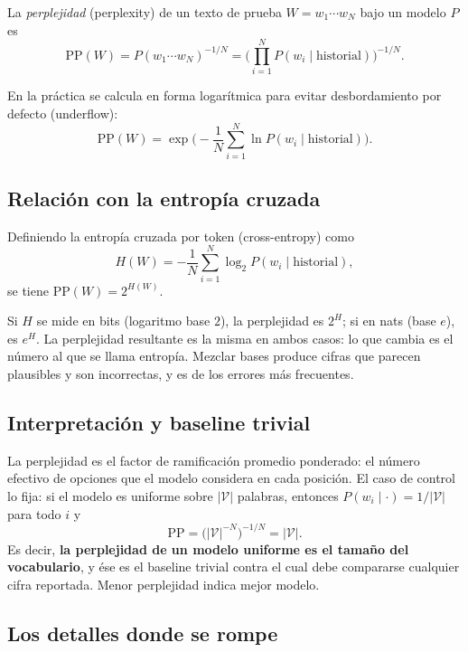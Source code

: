 \documentclass[11pt,letterpaper]{article}
\newcommand{\Vocab}{\mathcal{V}}
\begin{document}
\begin{definicion}
La \emph{perplejidad} (perplexity) de un texto de prueba $W=w_1\cdots w_N$ bajo
un modelo $P$ es
\[
\mathrm{PP}(W) = P(w_1\cdots w_N)^{-1/N}
= \Bigg(\prod_{i=1}^{N} P(w_i\mid \text{historial})\Bigg)^{-1/N} .
\]
\end{definicion}

En la práctica se calcula en forma logarítmica para evitar desbordamiento por
defecto (underflow):
\[
\mathrm{PP}(W) = \exp\Bigg(-\frac{1}{N}\sum_{i=1}^{N}\ln
P(w_i\mid\text{historial})\Bigg).
\]

\subsection{Relación con la entropía cruzada}

Definiendo la entropía cruzada por token (cross-entropy) como
\[
H(W) = -\frac{1}{N}\sum_{i=1}^{N} \log_2 P(w_i\mid\text{historial}),
\]
se tiene $\mathrm{PP}(W) = 2^{H(W)}$.

\begin{idea}[title={La base debe ser consistente}]
Si $H$ se mide en bits (logaritmo base $2$), la perplejidad es $2^{H}$; si en
nats (base $e$), es $e^{H}$. La perplejidad resultante es la misma en ambos
casos: lo que cambia es el número al que se llama entropía. Mezclar bases
produce cifras que parecen plausibles y son incorrectas, y es de los errores más
frecuentes.
\end{idea}

\subsection{Interpretación y baseline trivial}

La perplejidad es el factor de ramificación promedio ponderado: el número
efectivo de opciones que el modelo considera en cada posición. El caso de
control lo fija: si el modelo es uniforme sobre $|\Vocab|$ palabras, entonces
$P(w_i\mid\cdot)=1/|\Vocab|$ para todo $i$ y
\[
\mathrm{PP} = \big(|\Vocab|^{-N}\big)^{-1/N} = |\Vocab| .
\]
Es decir, \textbf{la perplejidad de un modelo uniforme es el tamaño del
vocabulario}, y ése es el baseline trivial contra el cual debe compararse
cualquier cifra reportada. Menor perplejidad indica mejor modelo.

\subsection{Los detalles donde se rompe}
\end{document}
